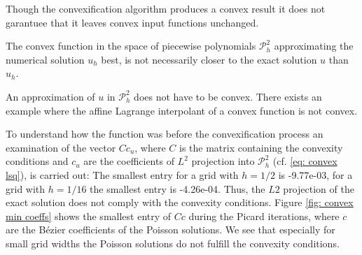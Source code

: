 Though the convexification algorithm produces a convex result it does not garantuee that it leaves convex input functions unchanged.

The convex function in the space of piecewise polynomials $\mathcal P^2_h$ approximating the numerical solution $u_h$ best, is not necessarily closer to the exact solution $u$ than $u_h$. %

An approximation of $u$ in $\mathcal P^2_h$ does not have to be convex. There exists an example where the affine Lagrange interpolant of a convex function is not convex\cite[p.3142]{AM2009}. 

To understand how  the function was before the convexification process an examination of the vector $Cc_u$, where $C$ is the matrix containing the convexity conditions and $c_u$ are the coefficients of $L^2$ projection into $\mathcal P^2_h$ (cf. \eqref{eq: convex lsq}), is carried out: The smallest entry for a grid with $h=1/2$ is -9.77e-03, for a grid with $h=1/16$ the smallest entry is -4.26e-04. Thus, the $L2$ projection of the exact solution does not comply with the convexity conditions.
Figure \ref{fig: convex min coeffs} shows the smallest entry of $Cc$ during the Picard iterations, where $c$ are the B\'ezier coefficients of the Poisson solutions. We see that especially for small grid widths the Poisson solutions do not fulfill the convexity conditions. 

